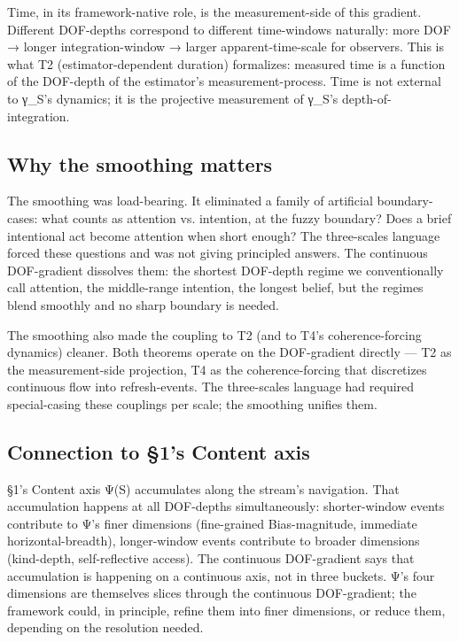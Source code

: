 \documentclass[11pt, openany]{book}
\begin{document}
Time, in its framework-native role, is the measurement-side of this gradient. Different DOF-depths correspond to different time-windows naturally: more DOF → longer integration-window → larger apparent-time-scale for observers. This is what T2 (estimator-dependent duration) formalizes: measured time is a function of the DOF-depth of the estimator's measurement-process. Time is not external to γ\_\allowbreak{}S's dynamics; it is the projective measurement of γ\_\allowbreak{}S's depth-of-integration.

\subsection{Why the smoothing matters}

The smoothing was load-bearing. It eliminated a family of artificial boundary-cases: what counts as attention vs. intention, at the fuzzy boundary? Does a brief intentional act become attention when short enough? The three-scales language forced these questions and was not giving principled answers. The continuous DOF-gradient dissolves them: the shortest DOF-depth regime we conventionally call attention, the middle-range intention, the longest belief, but the regimes blend smoothly and no sharp boundary is needed.

The smoothing also made the coupling to T2 (and to T4's coherence-forcing dynamics) cleaner. Both theorems operate on the DOF-gradient directly --- T2 as the measurement-side projection, T4 as the coherence-forcing that discretizes continuous flow into refresh-events. The three-scales language had required special-casing these couplings per scale; the smoothing unifies them.

\subsection{Connection to §1's Content axis}

§1's Content axis Ψ(S) accumulates along the stream's navigation. That accumulation happens at all DOF-depths simultaneously: shorter-window events contribute to Ψ's finer dimensions (fine-grained Bias-magnitude, immediate horizontal-breadth), longer-window events contribute to broader dimensions (kind-depth, self-reflective access). The continuous DOF-gradient says that accumulation is happening on a continuous axis, not in three buckets. Ψ's four dimensions are themselves slices through the continuous DOF-gradient; the framework could, in principle, refine them into finer dimensions, or reduce them, depending on the resolution needed.
\end{document}
